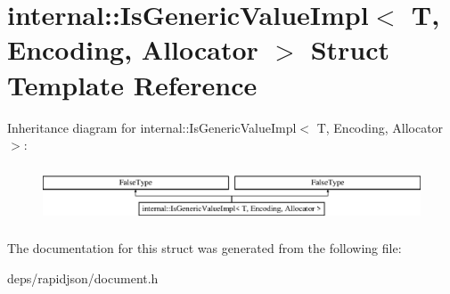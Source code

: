 \hypertarget{structinternal_1_1_is_generic_value_impl}{}\section{internal\+:\+:Is\+Generic\+Value\+Impl$<$ T, Encoding, Allocator $>$ Struct Template Reference}
\label{structinternal_1_1_is_generic_value_impl}
Inheritance diagram for internal\+:\+:Is\+Generic\+Value\+Impl$<$ T, Encoding, Allocator $>$\+:\begin{figure}[H]
\begin{center}
\leavevmode
\includegraphics[height=1.696970cm]{structinternal_1_1_is_generic_value_impl}
\end{center}
\end{figure}


The documentation for this struct was generated from the following file\+:\begin{DoxyCompactItemize}
\item 
deps/rapidjson/document.\+h\end{DoxyCompactItemize}
